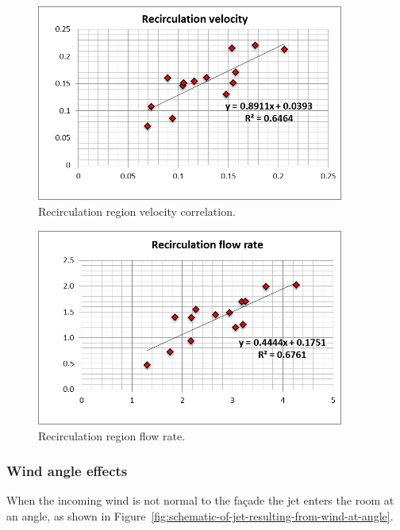 {\begin{figure}[hbtp]
\centering
\includegraphics[width=0.9\textwidth, height=0.9\textheight, keepaspectratio=true]{media/image2655.png}
\caption{Recirculation region velocity correlation. \protect \label{fig:recirculation-region-velocity}}
\end{figure}

\begin{figure}[hbtp]
\centering
\includegraphics[width=0.9\textwidth, height=0.9\textheight, keepaspectratio=true]{media/image2658.png}
\caption{Recirculation region flow rate. \protect \label{fig:recirculation-region-flow-rate}}
\end{figure}

\subsubsection{Wind angle effects}\label{wind-angle-effects}

When the incoming wind is not normal to the façade the jet enters the room at an angle, as shown in Figure~\ref{fig:schematic-of-jet-resulting-from-wind-at-angle}.

}
